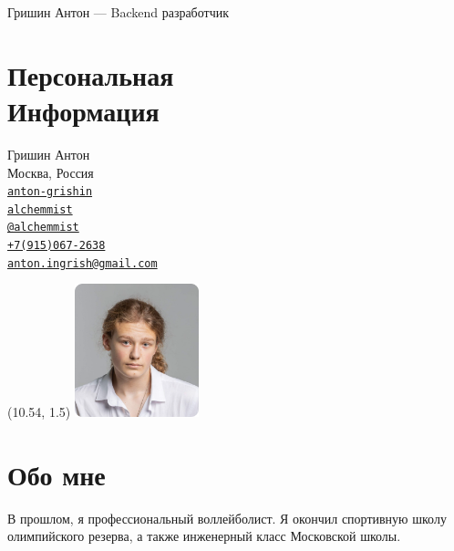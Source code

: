 \documentclass[margin,line]{resume}
\begin{document}
{\sc \large Гришин Антон --- Backend разработчик} \\
\begin{resume}
  \begin{minipage}[t]{0.55\textwidth}
    \section{\mysidestyle Персональная\\Информация}
    Гришин Антон \\
    Москва, Россия \\
    \faLinkedin \space
    \href{https://www.linkedin.com/in/anton-grishin-6966a8362/}{\texttt{anton-grishin}}
    \\
    \faGithub  \space
    \href{https://github.com/alchemmist/}{\texttt{alchemmist}} \\
    \faPaperPlane \space \href{https://t.me/alchemmist}{\texttt{@alchemmist}} \\
    \faPhone \space
    \href{tel:+1234567890}{\color{blue}\texttt{+7(915)067-2638}}  \\
    \faEnvelope \space
    \href{mailto:anton.ingrish@gmail.com}{\color{blue}\texttt{anton.ingrish@gmail.com}}
  \end{minipage}
  \begin{minipage}[H]{0.18\textwidth}
    \begin{textblock}{7}(10.54, 1.5)
      \includegraphics[width=0.27\textwidth]{images/avatar.png}
    \end{textblock}
  \end{minipage}
  \section{\mysidestyle Обо мне}
  В прошлом, я профессиональный воллейболист. Я окончил спортивную
  школу олимпийского резерва, а также инженерный класс Московской школы.


\end{resume}
\end{document}
